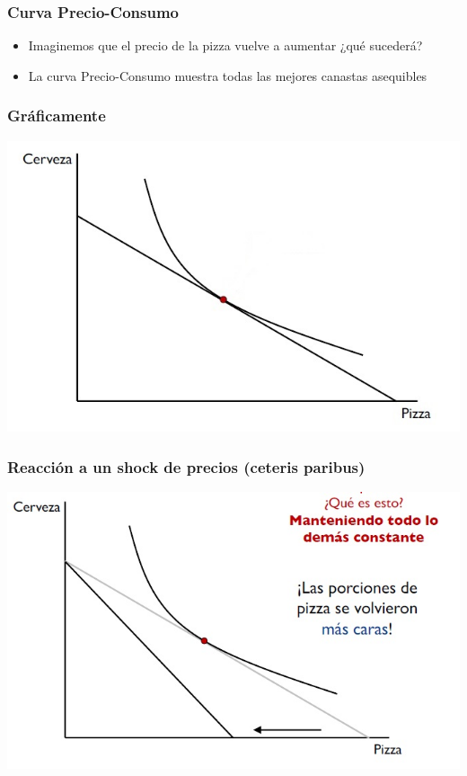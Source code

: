 \documentclass{beamer}
\begin{document}
\begin{frame}
\frametitle{ Curva Precio-Consumo}
\begin{itemize}
    \item Imaginemos que el precio de la pizza vuelve a aumentar ¿qué sucederá?  
    \item La curva Precio-Consumo muestra todas las mejores canastas asequibles 
\end{itemize}
\end{frame}

\begin{frame}
\frametitle{ Gráficamente}
\centering
\includegraphics[scale=0.65]{Figures/Tema_02.22_rp21.jpg}
\end{frame}


\begin{frame}
\frametitle{Reacción a un shock de precios (ceteris paribus)}
\centering
\includegraphics[scale=0.65]{Figures/Tema_02.20_rp18.jpg}
\end{frame}
\end{document}
